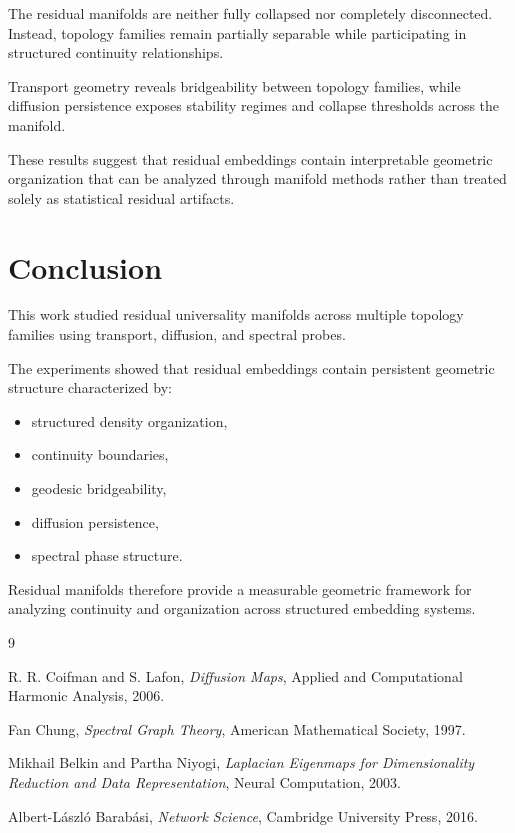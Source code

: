 \documentclass[11pt]{article}
\begin{document}
The residual manifolds are neither fully collapsed nor completely disconnected. Instead, topology families remain partially separable while participating in structured continuity relationships.

Transport geometry reveals bridgeability between topology families, while diffusion persistence exposes stability regimes and collapse thresholds across the manifold.

These results suggest that residual embeddings contain interpretable geometric organization that can be analyzed through manifold methods rather than treated solely as statistical residual artifacts.

\section{Conclusion}

This work studied residual universality manifolds across multiple topology families using transport, diffusion, and spectral probes.

The experiments showed that residual embeddings contain persistent geometric structure characterized by:

\begin{itemize}[leftmargin=1.5em]
    \item structured density organization,
    \item continuity boundaries,
    \item geodesic bridgeability,
    \item diffusion persistence,
    \item spectral phase structure.
\end{itemize}

Residual manifolds therefore provide a measurable geometric framework for analyzing continuity and organization across structured embedding systems.



\begin{thebibliography}{9}

R. R. Coifman and S. Lafon,
\textit{Diffusion Maps},
Applied and Computational Harmonic Analysis,
2006.

Fan Chung,
\textit{Spectral Graph Theory},
American Mathematical Society,
1997.

Mikhail Belkin and Partha Niyogi,
\textit{Laplacian Eigenmaps for Dimensionality Reduction and Data Representation},
Neural Computation,
2003.

Albert-László Barabási,
\textit{Network Science},
Cambridge University Press,
2016.

\end{thebibliography}
\end{document}
